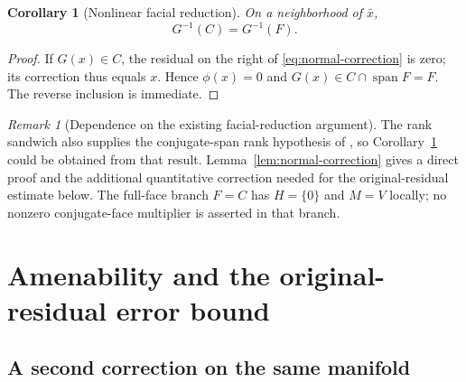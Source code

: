 \documentclass[11pt]{article}
\numberwithin{equation}{section}
\newtheorem{corollary}[theorem]{Corollary}
\theoremstyle{definition}
\theoremstyle{remark}
\newtheorem{remark}[theorem]{Remark}
\DeclareMathOperator{\spann}{span}
\newcommand{\xb}{\bar x}
\begin{document}
\begin{corollary}[Nonlinear facial reduction]
\label{cor:fr}
On a neighborhood of $\xb$,
\begin{equation}
 G^{-1}(C)=G^{-1}(F).
 \label{eq:fr}
\end{equation}
\end{corollary}
\begin{proof}
If $G(x)\in C$, the residual on the right of
\eqref{eq:normal-correction} is zero; its correction thus equals $x$.
Hence $\phi(x)=0$ and $G(x)\in C\cap\spann F=F$.
The reverse inclusion is immediate.
\end{proof}

\begin{remark}[Dependence on the existing facial-reduction argument]
The rank sandwich also supplies the conjugate-span rank hypothesis of
\citet[Proposition~5.2]{ahmr2025author}, so
Corollary~\ref{cor:fr} could be obtained from that result.
Lemma~\ref{lem:normal-correction} gives a direct proof and the additional
quantitative correction needed for the original-residual estimate below.
The full-face branch $F=C$ has $H=\{0\}$ and $M=V$ locally; no
nonzero conjugate-face multiplier is asserted in that branch.
\end{remark}

\section{Amenability and the original-residual error bound}
\label{sec:mscq}

\subsection{A second correction on the same manifold}
\end{document}
